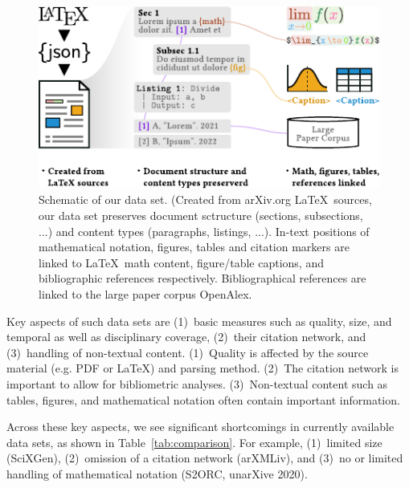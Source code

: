 \begin{figure}[tb]
  \centering
  \includegraphics[width=\linewidth]{figures/ref_covgran/schema}
  \caption{Schematic of our data set. (Created from arXiv.org \LaTeX\ sources, our data set preserves document sctructure (sections, subsections, ...) and content types (paragraphs, listings, ...). In-text positions of mathematical notation, figures, tables and citation markers are linked to \LaTeX\ math content, figure/table captions, and bibliographic references respectively. Bibliographical references are linked to the large paper corpus OpenAlex.}
  \label{fig:schema}
\end{figure}


Key aspects of such data sets are (1)~basic measures such as quality, size, and temporal as well as disciplinary coverage, (2)~their citation network, and (3)~handling of non-textual content. (1)~Quality is affected by the source material (e.g. PDF or \LaTeX) and parsing method. (2)~The citation network is important to allow for bibliometric analyses. (3)~Non-textual content such as tables, figures, and mathematical notation often contain important information.

Across these key aspects, we see significant shortcomings in currently available data sets, as shown in Table~\ref{tab:comparison}. For example, (1)~limited size (SciXGen), (2)~omission of a citation network (arXMLiv), and (3)~no or limited handling of mathematical notation (S2ORC, unarXive 2020).

